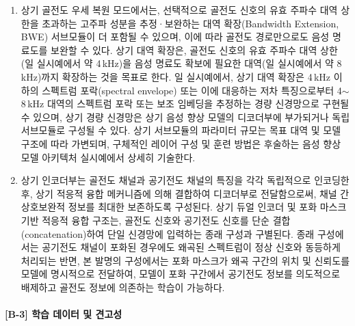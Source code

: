 \documentclass{article}
\begin{document}
\begin{enumerate}[label = \textbf{(B.2.\arabic*)}]
    \item 상기 골전도 우세 복원 모드에서는, 선택적으로
    골전도 신호의 유효 주파수 대역 상한을 초과하는
    고주파 성분을 추정·보완하는 대역 확장(Bandwidth Extension, BWE)
    서브모듈이 더 포함될 수 있으며, 이에 따라 골전도
    경로만으로도 음성 명료도를 보완할 수 있다.
    상기 대역 확장은, 골전도 신호의 유효 주파수 대역 상한(일 실시예에서 약 4\,kHz)을
    음성 명료도 확보에 필요한 대역(일 실시예에서 약 8\,kHz)까지 확장하는 것을 목표로 한다.
    일 실시예에서, 상기 대역 확장은 4\,kHz 이하의 스펙트럼 포락(spectral envelope) 또는
    이에 대응하는 저차 특징으로부터 4$\sim$8\,kHz 대역의 스펙트럼 포락 또는 보조 임베딩을
    추정하는 경량 신경망으로 구현될 수 있으며, 상기 경량 신경망은 상기 음성 향상 모델의
    디코더부에 부가되거나 독립 서브모듈로 구성될 수 있다. 상기 서브모듈의 파라미터 규모는
    목표 대역 및 모델 구조에 따라 가변되며, 구체적인 레이어 구성 및 훈련 방법은 후술하는
    음성 향상 모델 아키텍처 실시예에서 상세히 기술한다.


    \item 상기 인코더부는 골전도 채널과 공기전도 채널의 특징을 각각
    독립적으로 인코딩한 후, 상기 적응적 융합 메커니즘에 의해 결합하여
    디코더부로 전달함으로써, 채널 간 상호보완적 정보를 최대한 보존하도록
    구성된다. 상기 듀얼 인코더 및 포화 마스크 기반 적응적 융합 구조는, 골전도 신호와 공기전도 신호를 단순 결합(concatenation)하여 단일 신경망에 입력하는 종래 구성과 구별된다. 종래 구성에서는 공기전도 채널이 포화된 경우에도 왜곡된 스펙트럼이 정상 신호와 동등하게 처리되는 반면, 본 발명의 구성에서는 포화 마스크가 왜곡 구간의 위치 및 신뢰도를 모델에 명시적으로 전달하여, 모델이 포화 구간에서 공기전도 정보를 의도적으로 배제하고 골전도 정보에 의존하는 학습이 가능하다.

\end{enumerate}


\paragraph{[B-3] 학습 데이터 및 견고성}
\end{document}
